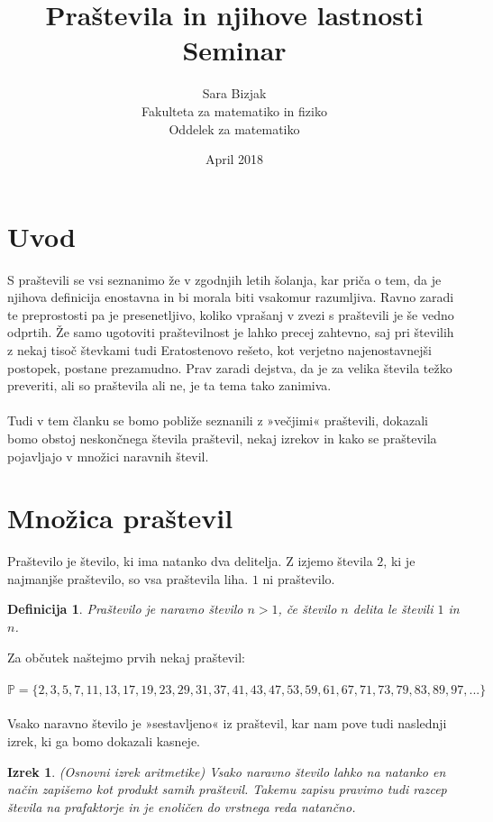 \documentclass[a4paper,12pt]{article}
\title{\Huge Praštevila in njihove lastnosti \\ 
\Large Seminar}
\author{Sara Bizjak \\
Fakulteta za matematiko in fiziko \\
Oddelek za matematiko}
\date{April 2018}
\newtheorem{izrek}{Izrek}
\newtheorem{definicija}{Definicija}
\begin{document}
	
\maketitle

\newpage

\tableofcontents

\newpage

\section{Uvod}
S praštevili se vsi seznanimo že v zgodnjih letih šolanja, kar priča o tem, da
je njihova definicija enostavna in bi morala biti vsakomur razumljiva. Ravno
zaradi te preprostosti pa je presenetljivo, koliko vprašanj v zvezi s praštevili je
še vedno odprtih. Že samo ugotoviti praštevilnost je lahko precej zahtevno, saj
pri številih z nekaj tisoč števkami tudi Eratostenovo rešeto, kot verjetno najenostavnejši
postopek, postane prezamudno. Prav zaradi dejstva, da je za velika
števila težko preveriti, ali so praštevila ali ne, je ta tema tako zanimiva.
\\
\\
Tudi v tem članku se bomo pobliže seznanili z »večjimi« praštevili, dokazali
bomo obstoj neskončnega števila praštevil, nekaj izrekov in kako se praštevila
pojavljajo v množici naravnih števil.

\newpage

\section{Množica praštevil}
Praštevilo je število, ki ima natanko dva delitelja. Z izjemo števila $2$, ki je najmanjše
praštevilo, so vsa praštevila liha. $1$ ni praštevilo.

\begin{definicija}
	Praštevilo je naravno število $n > 1$, če število $n$ delita le števili $1$ in $n$.
\end{definicija}
Za občutek naštejmo prvih nekaj praštevil:
\\
\\
$\mathbb{P} = \{2, 3, 5, 7, 11, 13, 17, 19, 23, 29, 31, 37, 41, 43, 47, 53, 59, 61, 67, 71, 73, 79, 83, 89, 97, ... \} $
\\
\\
Vsako naravno število je »sestavljeno« iz praštevil, kar nam pove tudi naslednji
izrek, ki ga bomo dokazali kasneje.
\begin{izrek}
	(Osnovni izrek aritmetike) Vsako naravno število lahko na natanko
	en način zapišemo kot produkt samih praštevil. Takemu zapisu pravimo tudi razcep števila na prafaktorje in je enoličen do vrstnega reda natančno.
\end{izrek}
\end{document}
